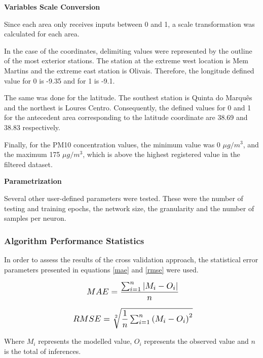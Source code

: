 \textbf{Variables Scale Conversion}

Since each area only receives inputs between 0 and 1, a scale transformation was calculated for each area.

In the case of the coordinates, delimiting values were represented by the outline of the most exterior stations. The station at the extreme west location is Mem Martins and the extreme east station is Olivais. Therefore, the longitude defined value for 0 is -9.35 and for 1 is -9.1.

The same was done for the latitude. The southest station is Quinta do Marquês and the northest is Loures Centro. Consequently, the defined values for 0 and 1 for the antecedent area corresponding to the latitude coordinate are 38.69 and 38.83 respectively.

Finally, for the PM10 concentration values, the minimum value was 0 $\mu g/m^3$, and the maximum 175 $\mu g/m^3$, which is above the highest registered value in the filtered dataset.

\textbf{Parametrization}

Several other user-defined parameters were tested. These were the number of testing and training epochs, the network size, the granularity and the number of samples per neuron.

\subsubsection{Algorithm Performance Statistics}

In order to assess the results of the cross validation approach, the statistical error parameters presented in equations \eqref{mae} and \eqref{rmse} were used.

\begin{equation} 
\label{mae}
\scalebox{1.2}{ $ MAE = \dfrac{\sum_{i=1}^{n} |M_i - O_i|}{n}$}
\end{equation}

\begin{equation} 
\label{rmse}
\scalebox{1.2}{ $ RMSE = \sqrt[2]{\dfrac{1}{n}\sum_{i=1}^{n} {(M_i - O_i)}^{2}}$}
\end{equation}


Where $M_i$ represents the modelled value, $O_i$ represents the observed value and $n$ is the total of inferences.%


